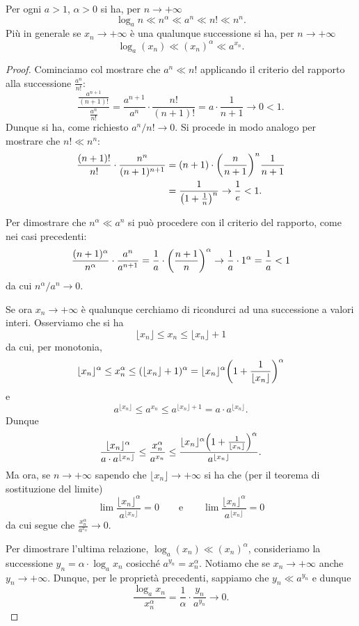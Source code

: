 \begin{theorem}
\label{th:ordine_infinito}%
%
\mymark{***}%
Per ogni $a>1$, $\alpha>0$ si ha, per $n\to +\infty$
\[
\log_a n \ll n^\alpha \ll a^n \ll n! \ll n^n.
\]
Più in generale se $x_n \to +\infty$
è una qualunque successione si ha,
per $n\to+\infty$
\[
\log_a(x_n) \ll (x_n)^\alpha \ll a^{x_n}.
\]
\end{theorem}
%
\begin{proof}
\mymark{**}
Cominciamo col mostrare che $a^n \ll n!$
applicando il criterio del rapporto alla successione $\frac{a^n}{n!}$:
\[
\frac{\displaystyle \frac{a^{n+1}}{(n+1)!}}{\displaystyle \frac{a^n}{n!}}
= \frac{a^{n+1}}{a^n}\cdot \frac{n!}{(n+1)!}
= a \cdot \frac {1}{n + 1} \to 0 < 1.
\]
Dunque si ha, come richiesto $a^n / n! \to 0$.
Si procede in modo analogo per mostrare che $n! \ll n^n$:
\begin{align*}
\frac{(n+1)!}{n!}\cdot \frac{n^n}{(n+1)^{n+1}}
&= (n+1) \cdot {\left( \frac{n}{n+1} \right)}^n \frac {1}{n+1}\\
&= \frac{1}{{\left( 1+\frac 1 n \right)}^n} \to \frac 1 e < 1.
\end{align*}

Per dimostrare che
$n^\alpha \ll a^n$
si può procedere con il criterio del rapporto, come nei casi precedenti:
\[
\frac{(n+1)^\alpha}{n^\alpha}\cdot \frac{a^n}{a^{n+1}}
= \frac 1 a \cdot {\left( \frac{n+1}{n} \right)}^\alpha \to \frac 1 a \cdot 1^\alpha = \frac 1 a < 1
\]
da cui $n^\alpha / a^n \to 0$.

Se ora $x_n\to +\infty$ è qualunque
cerchiamo di ricondurci ad una successione a valori interi.
Osserviamo che si ha
\[
\lfloor x_n \rfloor
\le x_n
\le \lfloor x_n \rfloor + 1
\]
da cui, per monotonia,
\[
\lfloor x_n \rfloor^\alpha
\le x_n^\alpha
\le (\lfloor x_n \rfloor + 1)^\alpha
= \lfloor x_n \rfloor^\alpha {\left( 1+ \frac{1}{\lfloor x_n \rfloor} \right)}^\alpha
\]
e
\[
a^{\lfloor x_n \rfloor}
\le a^{x_n}
\le a^{\lfloor x_n \rfloor + 1}
= a \cdot a^{\lfloor x_n \rfloor}.
\]
Dunque
\[
\frac{\lfloor x_n \rfloor^\alpha}{a \cdot a^{\lfloor x_n \rfloor}}
\le \frac{x_n^\alpha}{a^{x_n}}
\le \frac{\lfloor x_n \rfloor^\alpha {\left( 1+ \frac{1}{\lfloor x_n \rfloor} \right)}^\alpha}
    {a^{\lfloor x_n \rfloor}}.
\]
Ma ora, se $n\to +\infty$ sapendo che $\lfloor x_n\rfloor \to +\infty$ si ha
che (per il teorema di sostituzione del limite)
\[
\lim \frac{\lfloor x_n \rfloor^\alpha}{a^{\lfloor x_n \rfloor}} = 0
\qquad
\text{e}
\qquad
\lim \frac{\lfloor x_n \rfloor^\alpha }
    {a^{\lfloor x_n \rfloor}} = 0
\]
da cui segue che $\frac{x_n^\alpha}{a^{x_n}}\to 0$.

Per dimostrare l'ultima relazione, $\log_a(x_n)\ll (x_n)^\alpha$,
consideriamo la successione $y_n = \alpha \cdot \log_a x_n$
cosicché $a^{y_n} = x_n^\alpha$.
Notiamo che se $x_n\to +\infty$
anche $y_n \to +\infty$.
Dunque, per le proprietà precedenti,
sappiamo che $y_n \ll a^{y_n}$ e dunque
\[
\frac{\log_a x_n}{x_n^\alpha}
= \frac{1}{\alpha}\cdot\frac{y_n}{a^{y_n}} \to 0.
\]
\end{proof}

